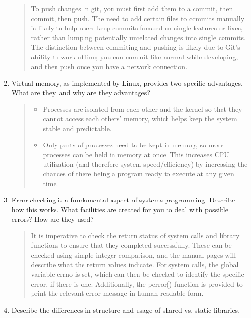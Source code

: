 \documentclass[letterpaper,10pt,onecolumn,titlepage]{article}
\begin{document}
\begin{enumerate}[itemsep=0.1 in]
\begin{quote}
  To push changes in git, you must first add them to a commit, then commit, then push.  The need to add certain files to commits manually is likely to help users keep commits focused on single features or fixes, rather than lumping potentially unrelated changes into single commits.  The distinction between commiting and pushing is likely due to Git's ability to work offline; you can commit like normal while developing, and then push once you have a network connection.
\end{quote}

\item Virtual memory, as implemented by Linux, provides two specific advantages. What are
  they, and why are they advantages?

\begin{quote}
  \begin{itemize}
    \item Processes are isolated from each other and the kernel so that they cannot access each others' memory, which helps keep the system stable and predictable.
    \item Only parts of processes need to be kept in memory, so more processes can be held in memory at once.  This increases CPU utilization (and therefore system speed/efficiency) by increasing the chances of there being a program ready to execute at any given time.
  \end{itemize}
\end{quote}

\item Error checking is a fundamental aspect of systems programming. Describe how this
  works. What facilities are created for you to deal with possible errors? How are they
  used?

\begin{quote}
  It is imperative to check the return status of system calls and library functions to ensure that they completed successfully.  These can be checked using simple integer comparison, and the manual pages will describe what the return values indicate.  For system calls, the global variable errno is set, which can then be checked to identify the specific error, if there is one.  Additionally, the perror() function is provided to print the relevant error message in human-readable form.
\end{quote}

\item Describe the differences in structure and usage of shared vs. static libraries.


\end{enumerate}
\end{document}
